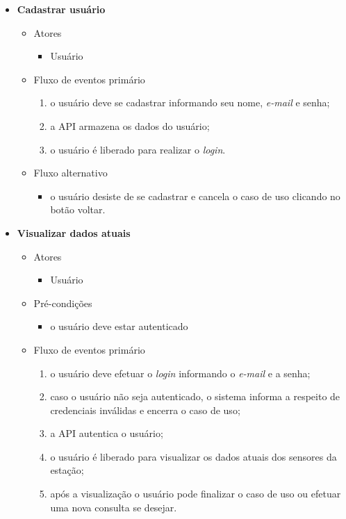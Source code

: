 \begin{itemize}
	\item \textbf{Cadastrar usuário}

		\begin{itemize}
    		\item Atores
		    	\begin{itemize}
    		    	\item Usuário
		    	\end{itemize}

	    	\item Fluxo de eventos primário
			    \begin{enumerate}
	    		    \item o usuário deve se cadastrar informando seu nome, \textit{e-mail} e senha;
		        	\item a API armazena os dados do usuário;
		    	    \item o usuário é liberado para realizar o \textit{login}.
			    \end{enumerate}

    		\item Fluxo alternativo
			    \begin{itemize}
		    	   \item o usuário desiste de se cadastrar e cancela o caso de uso clicando no botão voltar.
	    		\end{itemize}

		\end{itemize}

	\item \textbf{Visualizar dados atuais}

		\begin{itemize}
		    \item Atores
	    		\begin{itemize}
		    	    \item Usuário
			    \end{itemize}
    
	    	\item Pré-condições
			    \begin{itemize}
		     	   \item o usuário deve estar autenticado
			    \end{itemize}

	    	\item Fluxo de eventos primário
			    \begin{enumerate}
		    	    \item o usuário deve efetuar o \textit{login} informando o \textit{e-mail} e a senha;
	    		    \item caso o usuário não seja autenticado, o sistema informa a respeito de credenciais inválidas e encerra o caso de uso;
		    	    \item a API autentica o usuário;
    			    \item o usuário é liberado para visualizar os dados atuais dos sensores da estação;
		        	\item após a visualização o usuário pode finalizar o caso de uso ou efetuar uma nova consulta se desejar.
			    \end{enumerate}


\end{itemize}
\end{itemize}
